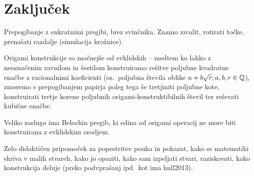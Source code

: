 \section{Zaključek}

Prepogibanje z enkratnimi pregibi, brez svinčnika. Znamo zrcalit, rotirati točke, prenašati razdalje (simulacija krožnice).

Origami konstrukcije so močnejše od evklidskih -- medtem ko lahko z neoznačenim ravnilom in šestilom konstruiramo rešitve poljubne kvadratne enačbe z racionalnimi koeficienti (oz.\ poljubna števila oblike $a + b\sqrt{r}; a,b,r \in \mathbb Q$), zmoremo s prepogibanjem papirja poleg tega še tretjiniti poljubne kote, konstruirati tretje korene poljubnih origami-konstruktibilnih števil ter reševati kubične enačbe.

Veliko zaslugo ima Belochin pregib, ki edina od origami operacij ne more biti konstruirana z evklidskim orodjem.

Zelo didaktičen pripomoček za popestritev pouka in pokazat, kako se matematiki skriva v malih stvareh, kako jo opaziti, kako sam izpeljati stvari, raziskovati, kako konstrukcija deluje (preko podvprašanj ipd.\ kot ima hull2013).